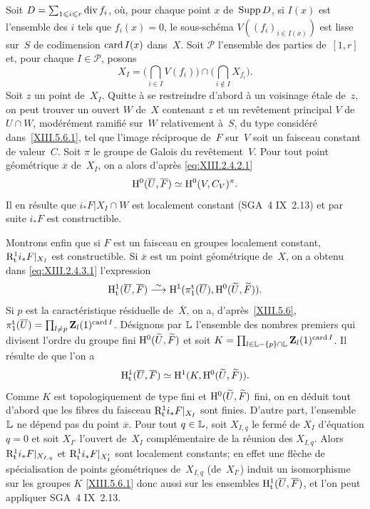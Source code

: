 Soit $D=\sum_{1\leqslant i\leqslant r}\operatorname{\mathrm{div}} f_i$, o\`u, pour chaque point
$x$ de~$\operatorname{Supp} D$, si $I(x)$ est l'ensemble des $i$ tels que
$f_i(x)=0$, le sous-sch\'ema $V((f_i)_{i\in I(x)})$ est lisse sur~$S$ de codimension $\operatorname{card} I(x)$ dans~$X$. Soit $\mathcal{P}$
l'ensemble des parties de~$[ 1,r ]$ et, pour chaque $I\in\mathcal{P}$,
posons
$$
X_I=\textstyle\Big(\bigcap_{i\in I}V(f_i)\Big)\cap\Big(\bigcap_{i\not\in I}X_{f_i}\Big).
$$
Soit
$z$ un point de~$X_I$. Quitte \`a se restreindre d'abord \`a un
voisinage \'etale de~$z$, on peut trouver un ouvert $W$ de~$X$
contenant $z$ et un rev\^etement principal $V$ de~$U\cap W$,
mod\'er\'ement ramifi\'e sur~$W$ relativement \`a~$S$, du type
consid\'er\'e dans~\ref{XIII.5.6.1}, tel que l'image
r\'eciproque de~$F$ sur~$V$ soit un faisceau constant de
valeur~$C$. Soit $\pi$ le groupe de Galois du rev\^etement~$V$. Pour
tout point g\'eom\'etrique $\overline{x}$ de~$X_I$, on a alors
d'apr\`es \eqref{eq:XIII.2.4.2.1}
$$
\mathrm{H}^0(\overline{U},\overline{F})\simeq \mathrm{H}^0(V,C_V)^{\pi}.
$$
Il en r\'esulte que $i_*F|X_I\cap W$ est localement constant (SGA~4
IX~2.13) et par suite $i_*F$ est constructible.

Montrons enfin que si $F$ est un faisceau en groupes localement
constant, $\mathrm{R}^1_{\mathrm{t}}i_*F|_{X_I}$ est constructible. Si
$\overline{x}$ est un point g\'eom\'etrique de~$X$, on a obtenu
dans \eqref{eq:XIII.2.4.3.1} l'expression
$$
\mathrm{H}^1_{\mathrm{t}}(\overline{U},\overline{F})\overset{\sim}{\longrightarrow}
\mathrm{H}^1(\pi^{\mathrm{t}}_1(\overline{U}),\mathrm{H}^0(\widetilde{U},\widetilde{F})).
$$
Si $p$ est la caract\'eristique r\'esiduelle de~$\overline{X}$, on
a, d'apr\`es~\ref{XIII.5.6},
$\pi_1^{\mathrm{t}}(\overline{U})=\prod_{l\neq p }\mathbf{Z}_l(1)^{\operatorname{card} I}$. D\'esignons par $\mathbb{L}$ l'ensemble des nombres premiers qui
divisent l'ordre du groupe fini $\mathrm{H}^0(\widetilde{U},\widetilde{F})$ et
soit $K=\prod_{l\in\mathbb{L} -\{p\}\cap\mathbb{L} }\mathbf{Z}_l(1)^{\operatorname{card} I}$. Il
r\'esulte de \cite[I \S5 ex.2]{XIII.4} que l'on a
$$
\mathrm{H}^1_{\mathrm{t}}(\overline{U},\overline{F})\simeq
\mathrm{H}^1(K,\mathrm{H}^0(\widetilde{U},\widetilde{F})).
$$
Comme $K$ est topologiquement de type fini et
$\mathrm{H}^0(\widetilde{U},\widetilde{F})$ fini, on en d\'eduit tout
d'abord que les fibres du faisceau $\mathrm{R}^1_{\mathrm{t}}i_*F|_{X_I}$ sont
finies. D'autre part, l'ensemble $\mathbb{L}$ ne d\'epend pas du point
$\overline{x}$. Pour tout $q\in\mathbb{L}$, soit $X_{I,q}$ le ferm\'e de
$X_I$ d'\'equation $q=0$ et soit $X_{I'}$ l'ouvert de~$X_I$
compl\'ementaire de la r\'eunion des $X_{I,q}$. Alors
$\mathrm{R}^1_{\mathrm{t}}i_*F|_{X_{I,q}}$ et $\mathrm{R}^1_{\mathrm{t}}i_*F|_{X_I'}$ sont
localement constants; en effet une fl\`eche de sp\'ecialisation de
points g\'eom\'etriques de~$X_{I,q}$ (\resp de~$X_{I'}$) induit un
isomorphisme sur les groupes $K$ \eqref{XIII.5.6.1} donc aussi sur les
ensembles $\mathrm{H}^1_{\mathrm{t}}(\overline{U},\overline{F})$, et l'on peut appliquer
SGA~4 IX~2.13.

